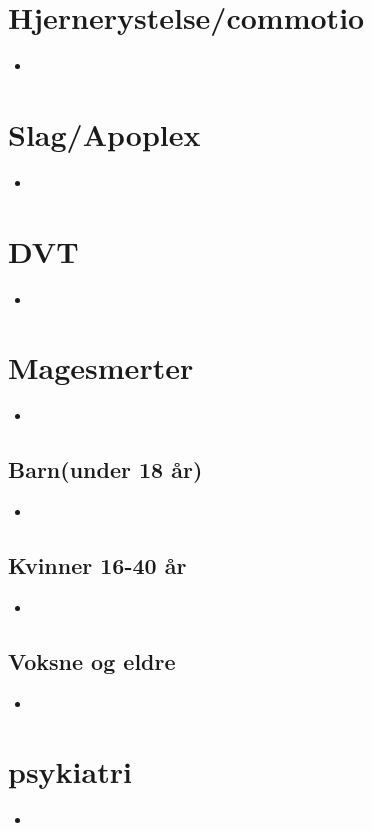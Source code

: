 	\section{Hjernerystelse/commotio}
		\begin{itemize}
			\item
		\end{itemize}
	\section{Slag/Apoplex}
		\begin{itemize}
			\item
		\end{itemize}
	\section{DVT}
		\begin{itemize}
			\item
		\end{itemize}
	\section{Magesmerter}
		\begin{itemize}
			\item
		\end{itemize}
		\subsection{Barn(under 18 år)}
			\begin{itemize}
				\item
			\end{itemize}
		\subsection{Kvinner 16-40 år}
			\begin{itemize}
				\item
			\end{itemize}
		\subsection{Voksne og eldre}
			\begin{itemize}
				\item
			\end{itemize}
	\section{psykiatri}
		\begin{itemize}
			\item
		\end{itemize}

